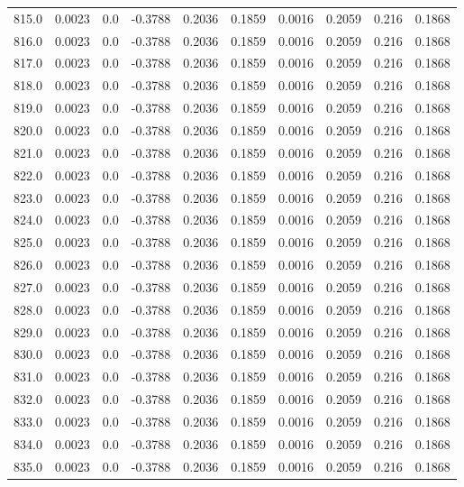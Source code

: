 \begin{longtable}{lrrrrrrrrr}
815.0 & 0.0023 & 0.0 & -0.3788 & 0.2036 & 0.1859 & 0.0016 & 0.2059 & 0.216 & 0.1868 \\
816.0 & 0.0023 & 0.0 & -0.3788 & 0.2036 & 0.1859 & 0.0016 & 0.2059 & 0.216 & 0.1868 \\
817.0 & 0.0023 & 0.0 & -0.3788 & 0.2036 & 0.1859 & 0.0016 & 0.2059 & 0.216 & 0.1868 \\
818.0 & 0.0023 & 0.0 & -0.3788 & 0.2036 & 0.1859 & 0.0016 & 0.2059 & 0.216 & 0.1868 \\
819.0 & 0.0023 & 0.0 & -0.3788 & 0.2036 & 0.1859 & 0.0016 & 0.2059 & 0.216 & 0.1868 \\
820.0 & 0.0023 & 0.0 & -0.3788 & 0.2036 & 0.1859 & 0.0016 & 0.2059 & 0.216 & 0.1868 \\
821.0 & 0.0023 & 0.0 & -0.3788 & 0.2036 & 0.1859 & 0.0016 & 0.2059 & 0.216 & 0.1868 \\
822.0 & 0.0023 & 0.0 & -0.3788 & 0.2036 & 0.1859 & 0.0016 & 0.2059 & 0.216 & 0.1868 \\
823.0 & 0.0023 & 0.0 & -0.3788 & 0.2036 & 0.1859 & 0.0016 & 0.2059 & 0.216 & 0.1868 \\
824.0 & 0.0023 & 0.0 & -0.3788 & 0.2036 & 0.1859 & 0.0016 & 0.2059 & 0.216 & 0.1868 \\
825.0 & 0.0023 & 0.0 & -0.3788 & 0.2036 & 0.1859 & 0.0016 & 0.2059 & 0.216 & 0.1868 \\
826.0 & 0.0023 & 0.0 & -0.3788 & 0.2036 & 0.1859 & 0.0016 & 0.2059 & 0.216 & 0.1868 \\
827.0 & 0.0023 & 0.0 & -0.3788 & 0.2036 & 0.1859 & 0.0016 & 0.2059 & 0.216 & 0.1868 \\
828.0 & 0.0023 & 0.0 & -0.3788 & 0.2036 & 0.1859 & 0.0016 & 0.2059 & 0.216 & 0.1868 \\
829.0 & 0.0023 & 0.0 & -0.3788 & 0.2036 & 0.1859 & 0.0016 & 0.2059 & 0.216 & 0.1868 \\
830.0 & 0.0023 & 0.0 & -0.3788 & 0.2036 & 0.1859 & 0.0016 & 0.2059 & 0.216 & 0.1868 \\
831.0 & 0.0023 & 0.0 & -0.3788 & 0.2036 & 0.1859 & 0.0016 & 0.2059 & 0.216 & 0.1868 \\
832.0 & 0.0023 & 0.0 & -0.3788 & 0.2036 & 0.1859 & 0.0016 & 0.2059 & 0.216 & 0.1868 \\
833.0 & 0.0023 & 0.0 & -0.3788 & 0.2036 & 0.1859 & 0.0016 & 0.2059 & 0.216 & 0.1868 \\
834.0 & 0.0023 & 0.0 & -0.3788 & 0.2036 & 0.1859 & 0.0016 & 0.2059 & 0.216 & 0.1868 \\
835.0 & 0.0023 & 0.0 & -0.3788 & 0.2036 & 0.1859 & 0.0016 & 0.2059 & 0.216 & 0.1868 \\

\end{longtable}
